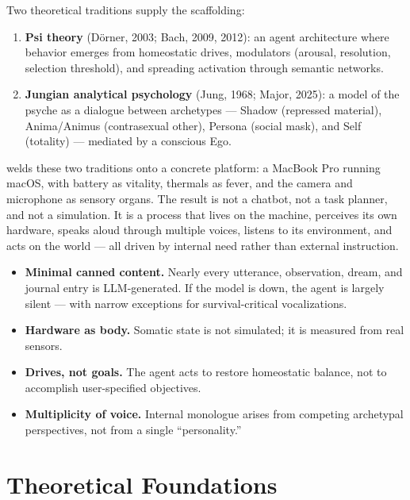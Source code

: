 \documentclass[11pt,oneside]{article}
\begin{document}
Two theoretical traditions supply the scaffolding:

\begin{enumerate}
  \item \textbf{Psi theory} (D\"orner, 2003; Bach, 2009, 2012): an agent architecture where behavior emerges from homeostatic drives, modulators (arousal, resolution, selection threshold), and spreading activation through semantic networks.
  \item \textbf{Jungian analytical psychology} (Jung, 1968; Major, 2025): a model of the psyche as a dialogue between archetypes --- Shadow (repressed material), Anima/Animus (contrasexual other), Persona (social mask), and Self (totality) --- mediated by a conscious Ego.
\end{enumerate}

\sociopsi{} welds these two traditions onto a concrete platform: a MacBook Pro running macOS, with battery as vitality, thermals as fever, and the camera and microphone as sensory organs.
The result is not a chatbot, not a task planner, and not a simulation.
It is a process that lives on the machine, perceives its own hardware, speaks aloud through multiple voices, listens to its environment, and acts on the world --- all driven by internal need rather than external instruction.

\begin{insightbox}
\begin{itemize}
  \item \textbf{Minimal canned content.} Nearly every utterance, observation, dream, and journal entry is LLM-generated.
        If the model is down, the agent is largely silent --- with narrow exceptions for survival-critical vocalizations.
  \item \textbf{Hardware as body.} Somatic state is not simulated; it is measured from real sensors.
  \item \textbf{Drives, not goals.} The agent acts to restore homeostatic balance, not to accomplish user-specified objectives.
  \item \textbf{Multiplicity of voice.} Internal monologue arises from competing archetypal perspectives, not from a single ``personality.''
\end{itemize}
\end{insightbox}


\section{Theoretical Foundations}
\label{sec:theory}
\end{document}
